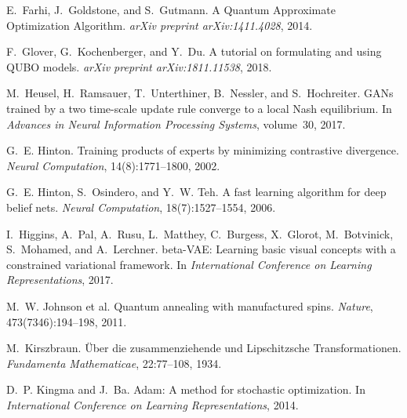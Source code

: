 \documentclass[11pt,letterpaper]{article}
\begin{document}
\begin{thebibliography}{99}
E.~Farhi, J.~Goldstone, and S.~Gutmann.
\newblock A Quantum Approximate Optimization Algorithm.
\newblock \emph{arXiv preprint arXiv:1411.4028}, 2014.

F.~Glover, G.~Kochenberger, and Y.~Du.
\newblock A tutorial on formulating and using QUBO models.
\newblock \emph{arXiv preprint arXiv:1811.11538}, 2018.

M.~Heusel, H.~Ramsauer, T.~Unterthiner, B.~Nessler, and S.~Hochreiter.
\newblock GANs trained by a two time-scale update rule converge to a local Nash equilibrium.
\newblock In \emph{Advances in Neural Information Processing Systems}, volume~30, 2017.

G.~E. Hinton.
\newblock Training products of experts by minimizing contrastive divergence.
\newblock \emph{Neural Computation}, 14(8):1771--1800, 2002.

G.~E. Hinton, S.~Osindero, and Y.~W. Teh.
\newblock A fast learning algorithm for deep belief nets.
\newblock \emph{Neural Computation}, 18(7):1527--1554, 2006.

I.~Higgins, A.~Pal, A.~Rusu, L.~Matthey, C.~Burgess, X.~Glorot, M.~Botvinick, S.~Mohamed, and A.~Lerchner.
\newblock beta-VAE: Learning basic visual concepts with a constrained variational framework.
\newblock In \emph{International Conference on Learning Representations}, 2017.

M.~W. Johnson et al.
\newblock Quantum annealing with manufactured spins.
\newblock \emph{Nature}, 473(7346):194--198, 2011.

M.~Kirszbraun.
\newblock Über die zusammenziehende und Lipschitzsche Transformationen.
\newblock \emph{Fundamenta Mathematicae}, 22:77--108, 1934.

D.~P. Kingma and J.~Ba.
\newblock Adam: A method for stochastic optimization.
\newblock In \emph{International Conference on Learning Representations}, 2014.


\end{thebibliography}
\end{document}
